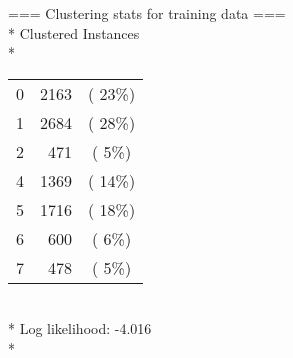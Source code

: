 === Clustering stats for training data ===\\*
Clustered Instances\\*
\begin{tabular}{lrc} 
0&2163&( 23\%)\\*
1&2684&( 28\%)\\*
2&471&(  5\%)\\*
4&1369&( 14\%)\\*
5&1716&( 18\%)\\*
6&600&(  6\%)\\*
7&478&(  5\%)\\*
\end{tabular}
\\*
\noindent Log likelihood: -4.016\\*